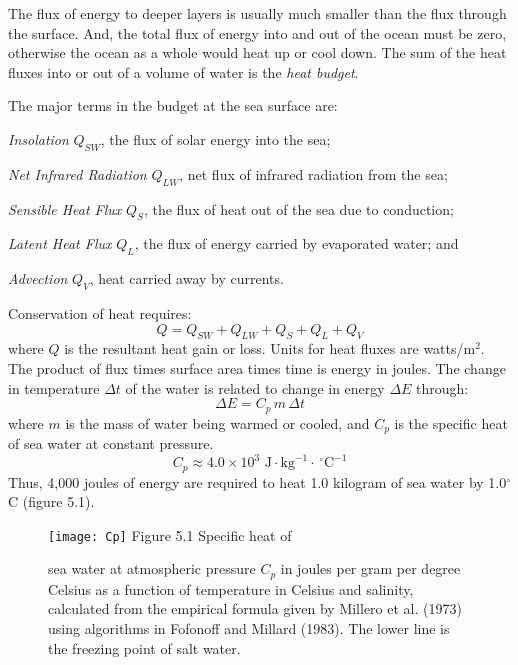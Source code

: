 The flux of energy to deeper layers is usually much smaller than the
flux through the surface. And, the total flux of energy into and out
of the ocean must be zero, otherwise the ocean as a whole would heat
up or cool down. The sum of the heat fluxes into or out of a volume of
water is the \textit{heat budget}.

The major terms in the budget at the sea surface are:
\begin{enumerate}
\vitem \textit{Insolation} $Q_{SW}$, the flux
of solar energy into the sea;

\vitem \textit{Net Infrared Radiation} $Q_{LW}$, net flux of infrared radiation from the sea;

\vitem \textit{Sensible Heat Flux} $Q_S$, the flux of heat out of the sea due to conduction;

\vitem \textit{Latent Heat Flux} $Q_L$, the flux of energy carried by evaporated water; and

\vitem \textit{Advection} $Q_V$, heat carried
away by currents.
\end{enumerate}

Conservation of heat requires:
\begin{equation}Q = Q_{SW} + Q_{LW} + Q_S + Q_L + Q_V \end{equation}
where $Q$ is the resultant heat gain or loss. Units for heat
fluxes are watts/m$^2$. The product of flux
times surface area times time is energy in joules. The change in
temperature $\Delta t$ of the water is related to change in energy
$\Delta E$ through:
\begin{equation}
\Delta E = C_{p} \, m \, \Delta t
\end{equation}
where $m$ is the mass of water being warmed or cooled, and $C_p$ is
the specific heat of sea water at constant pressure.
\begin{equation}
C_{p} \approx 4.0\times 10^{3} \mbox{ J}\cdot \mbox{kg}^{-1} \cdot \, ^\circ
\mbox{C}^{-1}
\end{equation}
Thus, 4,000 joules of energy are required to heat 1.0 kilogram of sea
water by 1.0$^{\circ}$C (figure 5.1).

\begin{figure}[t!]
\texttt{[image: Cp]}
\footnotesize
Figure 5.1 Specific heat of \rule{0pt}{3ex}sea water at atmospheric
pressure $C_{p}$ in joules per gram per degree Celsius as a function
of temperature in Celsius and salinity, calculated from the empirical
formula given by Millero et al. (1973) using algorithms in Fofonoff
and Millard (1983). The lower line is the freezing point of salt
water.
\label{fig:Cp}
\vspace{-3ex}
\end{figure}

